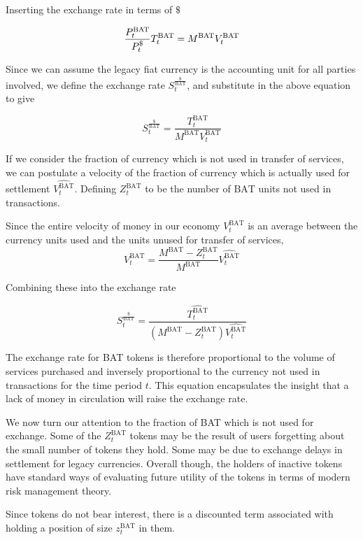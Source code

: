 \documentclass[11pt]{article}
\begin{document}
Inserting the exchange rate in terms of $\$$

\[ \frac{P^{\textrm{\textrm{BAT}}}_{t}}{P^{\$}_{t}} T^{\textrm{BAT}}_{t} = M^{\textrm{BAT}} V^{\textrm{BAT}}_{t}\]

Since we can assume the legacy fiat currency is the accounting unit
for all parties involved, we define the exchange rate $S^{\frac{\$}{\textrm{BAT}}}_{t}$, and substitute
in the above equation to give 

 \[S^{\frac{\$}{\textrm{BAT}}}_{t} = \frac{T^{\textrm{BAT}}_{t}}{M^{\textrm{BAT}} V^{\textrm{BAT}}_{t}} \]

If we consider the fraction of currency which is not used in transfer of services, we can postulate a velocity of the fraction of currency which is actually used for settlement $\widehat{V^{\textrm{BAT}}_{t}}$.
Defining $Z^{\textrm{BAT}}_{t}$ to be the number of $\textrm{BAT}$ units not used in transactions.


Since the entire velocity of money in our economy $V^{\textrm{BAT}}_{t}$ is an average
between the currency units used and the units unused for transfer of
services, 
   \[ V^{\textrm{BAT}}_{t} = \frac{M^{\textrm{BAT}}-Z^{\textrm{BAT}}_{t}}{M^{\textrm{BAT}}} \widehat{V^{\textrm{BAT}}_{t}}\] 

Combining these into the exchange rate

\[ \tag{1} S^{\frac{\$}{\textrm{BAT}}}_{t} = \frac{\widehat{T^{\textrm{BAT}}_{t}}}{(M^{\textrm{BAT}} - Z^{\textrm{BAT}}_{t} ) \widehat{V^{\textrm{BAT}}_{t}}} \]

The exchange rate for \textrm{BAT} tokens is therefore proportional to the
volume of services purchased and inversely proportional to the
currency not used in transactions for the time period $t$. This equation
encapsulates the insight that a lack of money in circulation will
raise the exchange rate.

We now turn our attention to the fraction of \textrm{BAT} which is not used for
exchange. Some of the $Z^{\textrm{BAT}}_{t}$ tokens may
be the result of users forgetting about the small number of tokens
they hold. Some may be due to exchange delays in settlement for legacy
currencies. Overall though, the holders of inactive tokens have
standard ways of evaluating future utility of the tokens in terms of
modern risk management theory.

Since tokens do not bear interest, there is a discounted term
associated with holding a position of size  $z^{\textrm{BAT}}_{t}$ in them.
\end{document}
